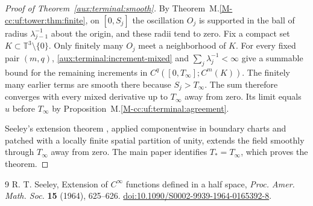 \documentclass[11pt]{amsart}
\numberwithin{equation}{section}
\begin{document}
\begin{proof}[Proof of Theorem~\ref{aux:terminal:smooth}]
By Theorem~M.\ref{M-cc:uf:tower:thm:finite}, on $[0,S_j]$ the
oscillation $O_j$ is supported in the ball of radius
$\lambda_{j-1}^{-1}$ about the origin, and these radii tend to zero.
Fix a compact set $K\subset\mathbb T^3\setminus\{0\}$.
Only finitely many $O_j$ meet a neighborhood of $K$.
For every fixed pair $(m,q)$, \eqref{aux:terminal:increment-mixed} and
$\sum_j\lambda_j^{-1}<\infty$ give a summable bound for the
remaining increments in $C^q([0,T_\infty];C^m(K))$.
The finitely many earlier terms are smooth there because
$S_j>T_\infty$. The sum therefore converges with every mixed derivative
up to $T_\infty$ away from zero. Its limit equals $u$ before $T_\infty$
by Proposition~M.\ref{M-cc:uf:terminal:agreement}.

Seeley's extension theorem \cite[p.\ 625]{Seeley}, applied componentwise
in boundary charts and patched with a locally finite spatial partition
of unity, extends the field smoothly through $T_\infty$ away from zero.
The main paper identifies $T_*=T_\infty$, which proves the theorem.
\end{proof}

\begin{thebibliography}{9}
 R. T. Seeley, Extension of $C^\infty$ functions defined
in a half space, \emph{Proc. Amer. Math. Soc.} \textbf{15} (1964), 625--626.
\href{https://doi.org/10.1090/S0002-9939-1964-0165392-8}{doi:10.1090/S0002-9939-1964-0165392-8}.
\end{thebibliography}
\end{document}
